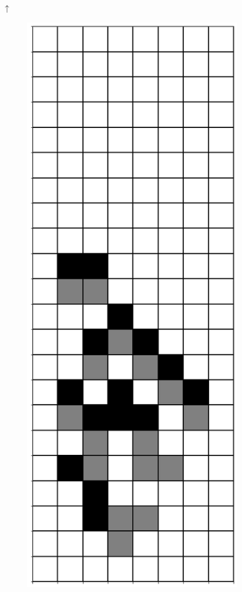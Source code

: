 \documentclass[12pt]{article}
\numberwithin{figure}{section} %
\begin{document}
\begin{figure}[H]
\begin{center}
{\Huge$\uparrow$}
\end{center}
     \begin{subfigure}{0.19\textwidth}
     \centering
     \includegraphics[width=\linewidth]{Section4/28.0}

\end{subfigure}
\end{figure}
\end{document}
